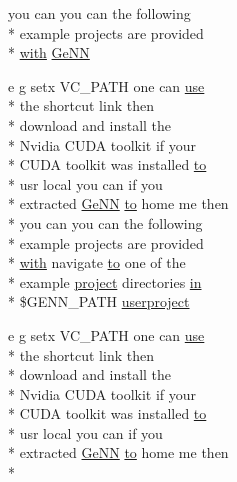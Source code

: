 \begin{DoxyCompactItemize}
you can you can the following \\*
example projects are provided \\*
\hyperlink{userproject_2OneComp__project_2README_8txt_ace09bb40fbf4457ad9a9340a67a4fa9a}{with} \hyperlink{README_8txt_a431a8d9aae97c72793fee7c3edd68559}{Ge\+N\+N}
\item 
e g setx V\+C\+\_\+\+P\+A\+T\+H one can \hyperlink{README_8txt_acf386c48a14a2099c9220d6bcde40fc8}{use} \\*
the shortcut link then \\*
download and install the \\*
Nvidia C\+U\+D\+A toolkit if your \\*
C\+U\+D\+A toolkit was installed \hyperlink{README_8txt_add1f2ee32acc15ef77f839d4382c9768}{to} \\*
usr local you can if you \\*
extracted \hyperlink{README_8txt_a431a8d9aae97c72793fee7c3edd68559}{Ge\+N\+N} \hyperlink{README_8txt_add1f2ee32acc15ef77f839d4382c9768}{to} home me then \\*
you can you can the following \\*
example projects are provided \\*
\hyperlink{userproject_2OneComp__project_2README_8txt_ace09bb40fbf4457ad9a9340a67a4fa9a}{with} navigate \hyperlink{README_8txt_add1f2ee32acc15ef77f839d4382c9768}{to} one of the \\*
example \hyperlink{userproject_2SynDelay__project_2README_8txt_a762c750134e07a31b7965860fd292b51}{project} directories \hyperlink{README_8txt_a148897a6b2cc9cff25af80abb13426b0}{in} \\*
\$G\+E\+N\+N\+\_\+\+P\+A\+T\+H \hyperlink{README_8txt_a1741404a85795919ea7af1da382b872d}{userproject}
\item 
e g setx V\+C\+\_\+\+P\+A\+T\+H one can \hyperlink{README_8txt_acf386c48a14a2099c9220d6bcde40fc8}{use} \\*
the shortcut link then \\*
download and install the \\*
Nvidia C\+U\+D\+A toolkit if your \\*
C\+U\+D\+A toolkit was installed \hyperlink{README_8txt_add1f2ee32acc15ef77f839d4382c9768}{to} \\*
usr local you can if you \\*
extracted \hyperlink{README_8txt_a431a8d9aae97c72793fee7c3edd68559}{Ge\+N\+N} \hyperlink{README_8txt_add1f2ee32acc15ef77f839d4382c9768}{to} home me then \\*

\end{DoxyCompactItemize}
